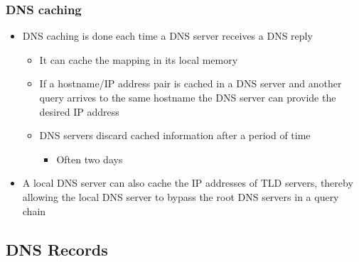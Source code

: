 \documentclass[11pt]{article}
\providecommand{\tightlist}{%
      \setlength{\itemsep}{0pt}\setlength{\parskip}{0pt}}
\begin{document}
    \subsubsection{DNS caching}\label{dns-caching}

\begin{itemize}
\tightlist
\item
  DNS caching is done each time a DNS server receives a DNS reply

  \begin{itemize}
  \tightlist
  \item
    It can cache the mapping in its local memory
  \item
    If a hostname/IP address pair is cached in a DNS server and another
    query arrives to the same hostname the DNS server can provide the
    desired IP address
  \item
    DNS servers discard cached information after a period of time

    \begin{itemize}
    \tightlist
    \item
      Often two days
    \end{itemize}
  \end{itemize}
\item
  A local DNS server can also cache the IP addresses of TLD servers,
  thereby allowing the local DNS server to bypass the root DNS servers
  in a query chain
\end{itemize}

    \subsection{DNS Records}\label{dns-records}
\end{document}
